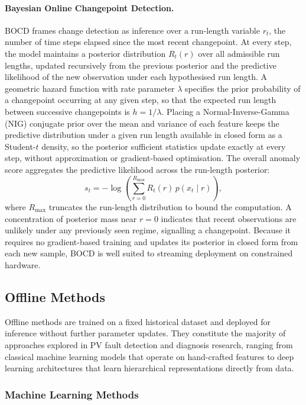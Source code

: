 \paragraph{Bayesian Online Changepoint Detection.}
BOCD frames change detection as inference over a run-length variable $r_t$, the number of time steps elapsed since the most recent changepoint. At every step, the model maintains a posterior distribution $R_t(r)$ over all admissible run lengths, updated recursively from the previous posterior and the predictive likelihood of the new observation under each hypothesised run length. A geometric hazard function with rate parameter $\lambda$ specifies the prior probability of a changepoint occurring at any given step, so that the expected run length between successive changepoints is $h=1/\lambda$. Placing a Normal-Inverse-Gamma (NIG) conjugate prior over the mean and variance of each feature keeps the predictive distribution under a given run length available in closed form as a Student-$t$ density, so the posterior sufficient statistics update exactly at every step, without approximation or gradient-based optimisation. The overall anomaly score aggregates the predictive likelihood across the run-length posterior:
\begin{equation}
    s_t = -\log\!\left(\sum_{r=0}^{R_{\max}} R_t(r)\, p(x_t \mid r)\right),
\end{equation}
where $R_{\max}$ truncates the run-length distribution to bound the computation. A concentration of posterior mass near $r=0$ indicates that recent observations are unlikely under any previously seen regime, signalling a changepoint. Because it requires no gradient-based training and updates its posterior in closed form from each new sample, BOCD is well suited to streaming deployment on constrained hardware.

\subsection{Offline Methods}
\label{sec:offline-methods}

Offline methods are trained on a fixed historical dataset and deployed for inference without further parameter updates. They constitute the majority of approaches explored in PV fault detection and diagnosis research, ranging from classical machine learning models that operate on hand-crafted features to deep learning architectures that learn hierarchical representations directly from data.

\subsubsection{Machine Learning Methods}
\label{sec:offline-ml}

